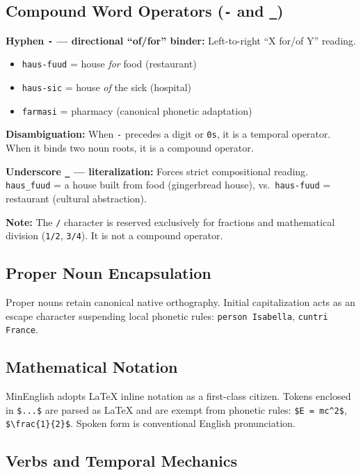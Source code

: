 \documentclass[12pt,onecolumn,letterpaper]{article}
\newcommand{\me}[1]{\texttt{#1}}
\begin{document}
\subsection{Compound Word Operators (\me{-} and \me{\_})}

\textbf{Hyphen \me{-} --- directional ``of/for'' binder:}
Left-to-right ``X for/of Y'' reading.
\begin{itemize}[leftmargin=*,noitemsep]
    \item \me{haus-fuud} = house \textit{for} food (restaurant)
    \item \me{haus-sic} = house \textit{of} the sick (hospital)
    \item \me{farmasi} = pharmacy (canonical phonetic adaptation)
\end{itemize}

\textbf{Disambiguation:} When \me{-} precedes a digit or \me{0s}, it is a
temporal operator. When it binds two noun roots, it is a compound operator.

\textbf{Underscore \me{\_} --- literalization:} Forces strict compositional
reading. \me{haus\_fuud} = a house built from food (gingerbread house),
vs.\ \me{haus-fuud} = restaurant (cultural abstraction).

\textbf{Note:} The \me{/} character is reserved exclusively for fractions
and mathematical division (\me{1/2}, \me{3/4}). It is not a compound operator.

\subsection{Proper Noun Encapsulation}
Proper nouns retain canonical native orthography. Initial capitalization acts
as an escape character suspending local phonetic rules: \me{person Isabella},
\me{cuntri France}.

\subsection{Mathematical Notation}
MinEnglish adopts LaTeX inline notation as a first-class citizen. Tokens
enclosed in \texttt{\$...\$} are parsed as LaTeX and are exempt from phonetic
rules: \texttt{\$E = mc\^{}2\$}, \texttt{\$\textbackslash frac\{1\}\{2\}\$}.
Spoken form is conventional English pronunciation.

\subsection{Verbs and Temporal Mechanics}
\end{document}
